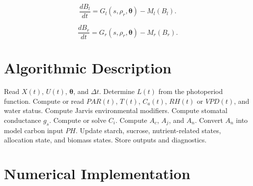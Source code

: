 \documentclass[a4paper,fleqn]{cas-dc}
\begin{document}
\begin{equation}
\frac{dB_l}{dt} =
G_l(s, \rho_r, \boldsymbol{\theta}) - M_l(B_l).
\end{equation}

\begin{equation}
\frac{dB_r}{dt} =
G_r(s, \rho_r, \boldsymbol{\theta}) - M_r(B_r).
\end{equation}


\section{Algorithmic Description}
\label{sec:algorithm}


\begin{algorithm}
\caption{One simulation step with Farquhar--Jarvis gas-exchange coupling}
\label{alg:simulation_step}
\begin{algorithmic}[1]
\STATE Read $X(t)$, $U(t)$, $\boldsymbol{\theta}$, and $\Delta t$.
\STATE Determine $L(t)$ from the photoperiod function.
\STATE Compute or read $PAR(t)$, $T(t)$, $C_a(t)$, $RH(t)$ or $VPD(t)$, and water status.
\STATE Compute Jarvis environmental modifiers.
\STATE Compute stomatal conductance $g_s$.
\STATE Compute or solve $C_i$.
\STATE Compute $A_c$, $A_j$, and $A_n$.
\STATE Convert $A_n$ into model carbon input $PH$.
\STATE Update starch, sucrose, nutrient-related states, allocation state, and biomass states.
\STATE Store outputs and diagnostics.
\end{algorithmic}
\end{algorithm}


\section{Numerical Implementation}
\label{sec:implementation}
\end{document}
